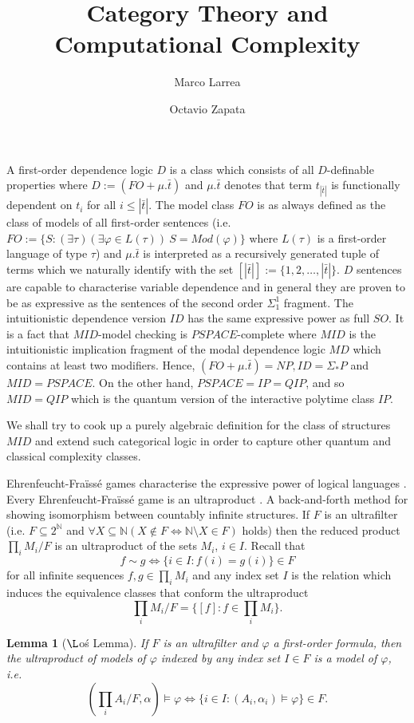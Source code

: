 \documentclass[10.5pt]{article}
\title{Category Theory and \\ Computational Complexity}
\author{Marco Larrea \and Octavio Zapata}
\newtheorem{lemma}{Lemma}
\begin{document}
\maketitle
A first-order dependence logic $D$ is a class which consists of all $D$-definable properties where $D := (FO + \mu.\bar{t})$ and $\mu.\bar{t}$ denotes that term $t_{|\bar{t}|}$ is functionally dependent on $t_{i}$ for all $i\leq |\bar{t}|$. The model class $FO$ is as always defined as the class of models of all first-order sentences (i.e. $FO:= \{S:(\exists\tau)(\exists\varphi\in L(\tau))\ S=Mod(\varphi)\}$ where $L(\tau)$ is a first-order language of type $\tau$) and $\mu.\bar{t}$ is interpreted as a recursively generated tuple of terms which we naturally identify with the set $[|\bar{t}|] := \{1,2,\dots,|\bar{t}|\}$. $D$ sentences are capable to characterise variable dependence and in general they are proven to be as expressive as the sentences of the second order $\Sigma_1^1$ fragment. The intuitionistic dependence version $ID$ has the same expressive power as full $SO$. It is a fact that $MID$-model checking is $PSPACE$-complete where $MID$ is the intuitionistic implication fragment of the modal dependence logic $MD$ which contains at least two modifiers. Hence, $(FO + \mu.\bar{t}) = NP, ID = \Sigma_{\ast}P$ and $MID = PSPACE$.  On the other hand, $PSPACE = IP = QIP$, and so $MID = QIP$ which is the quantum version of the interactive polytime class $IP$.

We shall try to cook up a purely algebraic definition for the class of structures $MID$ and extend such categorical logic in order to capture other quantum and classical complexity classes. 

Ehrenfeucht-Fra\"iss\'e games characterise the expressive power of logical languages \cite{ams}. Every Ehrenfeucht-Fra\"iss\'e game is an ultraproduct \cite{models}. A back-and-forth method for showing isomorphism between countably infinite structures. If $F$ is an ultrafilter (i.e. $F\subseteq 2^{\mathbb{N}}$ and $\forall X\subseteq\mathbb{N} (X\notin F \Leftrightarrow \mathbb{N}\setminus X\in F)$ holds) then the reduced product $\prod_{i}M_i / F$ is an ultraproduct of the sets $M_i$, $i\in I$. Recall that \[f\sim g \Leftrightarrow \{i\in I : f(i) = g(i)\}\in F\] for all infinite sequences $f,g\in\prod_i M_i$ and any index set $I$ is the relation which induces the equivalence classes that conform the ultraproduct \[\prod_{i}M_i / F = \{[f]:f\in\prod_i M_i\}.\] 

\begin{lemma}[$\L$o\'s Lemma]
If $F$ is an ultrafilter and $\varphi$ a first-order formula, then the ultraproduct of models of $\varphi$ indexed by any index set $I\in F$ is a model of $\varphi$, i.e. \[(\prod_i A_i / F , \alpha)\models\varphi\Leftrightarrow\{i\in I: (A_i, \alpha_i)\models\varphi\}\in F.\]
\end{lemma}

\nocite{*}


\end{document}
